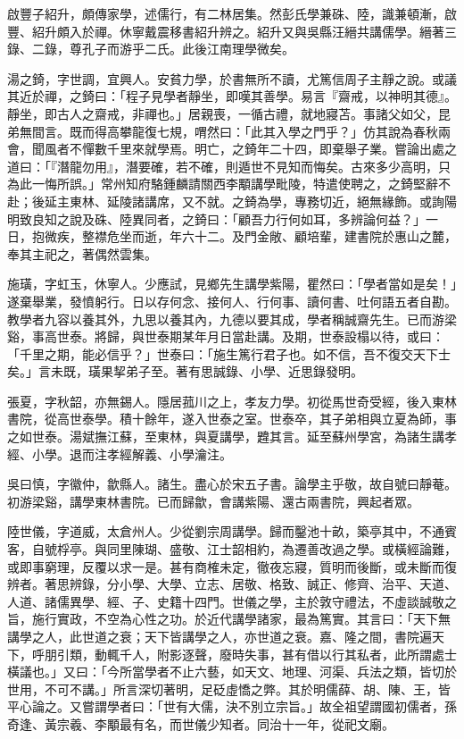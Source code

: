 \begin{pinyinscope}
啟豐子紹升，頗傳家學，述儒行，有二林居集。然彭氏學兼硃、陸，識兼頓漸，啟豐、紹升頗入於禪。休寧戴震移書紹升辨之。紹升又與吳縣汪縉共講儒學。縉著三錄、二錄，尊孔子而游乎二氏。此後江南理學微矣。

湯之錡，字世調，宜興人。安貧力學，於書無所不讀，尤篤信周子主靜之說。或議其近於禪，之錡曰：「程子見學者靜坐，即嘆其善學。易言『齋戒，以神明其德』。靜坐，即古人之齋戒，非禪也。」居親喪，一循古禮，就地寢苫。事諸父如父，昆弟無間言。既而得高攀龍復七規，喟然曰：「此其入學之門乎？」仿其說為春秋兩會，聞風者不憚數千里來就學焉。明亡，之錡年二十四，即棄舉子業。嘗論出處之道曰：「『潛龍勿用』，潛要確，若不確，則遁世不見知而悔矣。古來多少高明，只為此一悔所誤。」常州知府駱鍾麟請關西李顒講學毗陵，特遣使聘之，之錡堅辭不赴；後延主東林、延陵諸講席，又不就。之錡為學，專務切近，絕無緣飾。或詢陽明致良知之說及硃、陸異同者，之錡曰：「顧吾力行何如耳，多辨論何益？」一日，抱微疾，整襟危坐而逝，年六十二。及門金敞、顧培輩，建書院於惠山之麓，奉其主祀之，著偶然雲集。

施璜，字虹玉，休寧人。少應試，見鄉先生講學紫陽，瞿然曰：「學者當如是矣！」遂棄舉業，發憤躬行。日以存何念、接何人、行何事、讀何書、吐何語五者自勘。教學者九容以養其外，九思以養其內，九德以要其成，學者稱誠齋先生。已而游梁谿，事高世泰。將歸，與世泰期某年月日當赴講。及期，世泰設榻以待，或曰：「千里之期，能必信乎？」世泰曰：「施生篤行君子也。如不信，吾不復交天下士矣。」言未既，璜果挈弟子至。著有思誠錄、小學、近思錄發明。

張夏，字秋韶，亦無錫人。隱居菰川之上，孝友力學。初從馬世奇受經，後入東林書院，從高世泰學。積十餘年，遂入世泰之室。世泰卒，其子弟相與立夏為師，事之如世泰。湯斌撫江蘇，至東林，與夏講學，韙其言。延至蘇州學宮，為諸生講孝經、小學。退而注孝經解義、小學瀹注。

吳曰慎，字徽仲，歙縣人。諸生。盡心於宋五子書。論學主乎敬，故自號曰靜菴。初游梁谿，講學東林書院。已而歸歙，會講紫陽、還古兩書院，興起者眾。

陸世儀，字道威，太倉州人。少從劉宗周講學。歸而鑿池十畝，築亭其中，不通賓客，自號桴亭。與同里陳瑚、盛敬、江士韶相約，為遷善改過之學。或橫經論難，或即事窮理，反覆以求一是。甚有商榷未定，徹夜忘寢，質明而後斷，或未斷而復辨者。著思辨錄，分小學、大學、立志、居敬、格致、誠正、修齊、治平、天道、人道、諸儒異學、經、子、史籍十四門。世儀之學，主於敦守禮法，不虛談誠敬之旨，施行實政，不空為心性之功。於近代講學諸家，最為篤實。其言曰：「天下無講學之人，此世道之衰；天下皆講學之人，亦世道之衰。嘉、隆之間，書院遍天下，呼朋引類，動輒千人，附影逐聲，廢時失事，甚有借以行其私者，此所謂處士橫議也。」又曰：「今所當學者不止六藝，如天文、地理、河渠、兵法之類，皆切於世用，不可不講。」所言深切著明，足砭虛憍之弊。其於明儒薛、胡、陳、王，皆平心論之。又嘗謂學者曰：「世有大儒，決不別立宗旨。」故全祖望謂國初儒者，孫奇逢、黃宗羲、李顒最有名，而世儀少知者。同治十一年，從祀文廟。


\end{pinyinscope}
